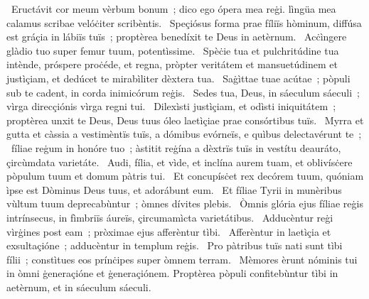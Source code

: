 ~Eructávit cor meum vèrbum bonum~; dico ego ópera mea reġi. lìngüa mea calamus scribae velóċiter scribèntis. 
~Speçiósus forma prae fíliïs hòminum, diffúsa est gráçia in lábiïs tuïs~; proptèrea benedíxit te Deus in aetèrnum. 
~Acċìngere glàdio tuo super femur tuum, potentìssime. 
~Spèċie tua et pulchritúdine tua intènde, próspere proċéde, et regna, pròpter veritátem et mansuetúdinem et justìçiam, et dedúcet te mirabìliter dèxtera tua. 
~Saġìttae tuae acútae~; pòpuli sub te cadent, in corda inimicórum reġis. 
~Sedes tua, Deus, in sáeculum sáeculi~; vìrga direcçiónis vìrga regni tui. 
~Dilexìsti justìçiam, et odìsti iniquitátem~; proptèrea unxit te Deus, Deus tuus óleo laetìçiae prae consórtibus tuïs. 
~Myrra et gutta et càssia a vestimèntïs tuïs, a dómibus evórneïs, e quìbus delectavérunt te~; 
~fíliae reġum in honóre tuo~; àstitit reġína a dèxtrïs tuïs in vestítu deauráto, çircùmdata varietáte. 
~Audi, fília, et vìde, et inclína aurem tuam, et oblivísċere pòpulum tuum et domum pàtris tui. 
~Et concupísċet rex decórem tuum, quóniam ìpse est Dòminus Deus tuus, et adorábunt eum. 
~Et fíliae Tyrii in munèribus vùltum tuum deprecabùntur~; òmnes dívites plebis. 
~Òmnis glória ejus fíliae reġis intrínsecus, in fìmbriïs áureïs, çircumamìcta varietátibus. 
~Adducèntur reġi vìrġines post eam~; pròximae ejus afferèntur tìbi. 
~Afferèntur in laetìçia et exsultaçióne~; adducèntur in templum reġis. 
~Pro pàtribus tuïs nati sunt tìbi fílii~; constìtues eos prínċipes super òmnem terram. 
~Mèmores èrunt nóminis tui in òmni ġeneraçióne et ġeneraçiónem. Proptèrea pòpuli confitebùntur tìbi in aetèrnum, et in sáeculum sáeculi. 
